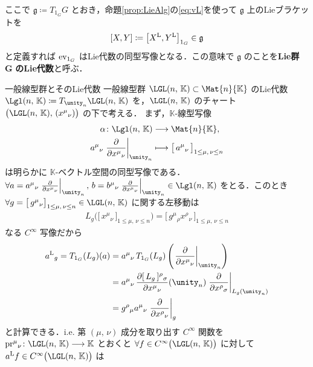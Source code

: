\documentclass[geometry_main]{subfiles}
\begin{document}
ここで $\bm{\mathfrak{g}} \coloneqq T_{1_G} G$ とおき，命題\ref{prop:LieAlg}の\eqref{eq:vL}を使って $\mathfrak{g}$ 上のLieブラケットを
\begin{align}
    \comm{X}{Y} \coloneqq \comm{\Lie{X}}{\Lie{Y}}_{1_G} \in \mathfrak{g}
\end{align}
と定義すれば $\mathrm{ev}_{1_G}$ はLie代数の同型写像となる．この意味で $\mathfrak{g}$ のことを\textbf{Lie群} $\bm{G}$ \textbf{のLie代数}と呼ぶ．

\begin{myexample}[label=ex:gl]{一般線型群とそのLie代数}
    一般線型群 $\LGL(n,\, \mathbb{K}) \subset \Mat{n}{\mathbb{K}}$ のLie代数 $\Lgl(n,\, \mathbb{K}) \coloneqq T_{\unity_n} \LGL(n,\, \mathbb{K})$ を，$\LGL(n,\,\mathbb{K})$ のチャート $\bigl( \LGL(n,\,\mathbb{K}),\, (x^\mu{}_\nu) \bigr)$ の下で考える．
    まず，$\mathbb{K}$-線型写像
    \begin{align}
        \alpha \colon \Lgl(n,\, \mathbb{K}) &\lto \Mat{n}{\mathbb{K}}, \\
        a^\mu{}_\nu \eval{\pdv{}{x^\mu{}_\nu}}_{\unity_n} &\lmto \bigl[\, a^\mu{}_\nu \,\bigr]_{1 \le \mu,\, \nu \le n}
    \end{align}
    は明らかに $\mathbb{K}$-ベクトル空間の同型写像である．
    $\forall a = a^\mu{}_\nu \eval{\pdv{}{x^\mu{}_\nu}}_{\unity_n} ,\, b = b^\mu{}_\nu \eval{\pdv{}{x^\mu{}_\nu}}_{\unity_n} \in \Lgl(n,\, \mathbb{K})$ 
    をとる．このとき $\forall g = \bigl[ \, g^{\mu}{}_\nu \bigr]_{1 \le \mu,\, \nu \le n} \in \LGL(n,\, \mathbb{K})$ に関する左移動は
    \begin{align}
        L_g \bigl(\bigl[\, x^\mu{}_\nu \,\bigr]_{1 \le \mu,\, \nu \le n} \bigr) 
        = \bigl[\, g^\mu{}_\rho x^\rho{}_\nu \,\bigr]_{1 \le \mu,\, \nu \le n}
    \end{align}
    なる $C^\infty$ 写像だから
    \begin{align}
        \Lie{a}{}_g = T_{1_G} (L_g) (a) 
        &= a^\mu{}_\nu\, T_{1_G} (L_g) \left( \eval{\pdv{}{x^\mu{}_\nu}}_{\unity_n} \right) \\
        &= a^\mu{}_\nu\, \pdv{[\, L_g \,]^\rho{}_\sigma}{x^\mu{}_\nu}()(\unity_n) \eval{\pdv{}{x^\rho{}_\sigma}}_{L_g(\unity_n)} \\
        &= g^\rho{}_\mu a^\mu{}_\nu \eval{\pdv{}{x^\rho{}_\nu}}_{g}
    \end{align}
    と計算できる．i.e. 第 $(\mu,\, \nu)$ 成分を取り出す $C^\infty$ 関数を $\mathrm{pr}^\mu{}_\nu \colon \LGL(n,\, \mathbb{K}) \lto \mathbb{K}$ とおくと  $\forall f \in C^\infty\bigl(\LGL(n,\, \mathbb{K})\bigr)$ に対して $\Lie{a} f \in C^\infty \bigl(\LGL(n,\, \mathbb{K})\bigr)$ は

\end{myexample}
\end{document}
